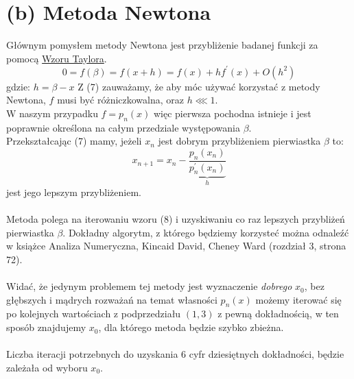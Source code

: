 \documentclass{article}
\begin{document}
\section{(b) Metoda Newtona}
Głównym pomysłem metody Newtona jest przybliżenie badanej funkcji za pomocą \href{https://pl.wikipedia.org/wiki/Wz%C3%B3r_Taylora}{Wzoru Taylora}.
\begin{equation}
0 = f(\beta) = f(x + h) = f(x) + hf^\prime(x) + O(h^2)
\end{equation}
gdzie: 
$h = \beta - x$
Z (7) zauważamy, że aby móc używać korzystać z metody Newtona, $f$ musi być różniczkowalna, oraz $h \lll 1$.\\ W naszym przypadku $f =p_n(x)$ więc pierwsza pochodna istnieje i jest poprawnie określona na całym przedziale występowania $\beta$.\\
Przekształcając (7) mamy, jeżeli $x_n$ jest dobrym przybliżeniem pierwiastka $\beta$ to:
\begin{equation}
x_{n+1} = x_n - \underbrace{\frac{p_n(x_n)}{p_n^\prime(x_n)}}_h
\end{equation}
jest jego lepszym przybliżeniem.\\\\Metoda polega na iterowaniu wzoru (8) i uzyskiwaniu co raz lepszych przybliżeń pierwiastka $\beta$. Dokładny algorytm, z którego będziemy korzysteć można odnaleźć w książce Analiza Numeryczna, Kincaid David, Cheney Ward (rozdział 3, strona 72).\\\\
Widać, że jedynym problemem tej metody jest wyznaczenie \textit{dobrego} $x_0$, bez głębszych i mądrych rozważań na temat własności $p_n(x)$ możemy iterować się po kolejnych wartościach z podprzedziału $(1,3)$ z pewną dokładnością, w ten sposób znajdujemy $x_0$, dla którego metoda będzie szybko zbieżna.\\\\
Liczba iteracji potrzebnych do uzyskania 6 cyfr dziesiętnych dokładności, będzie zależała od wyboru $x_0$.
\end{document}
